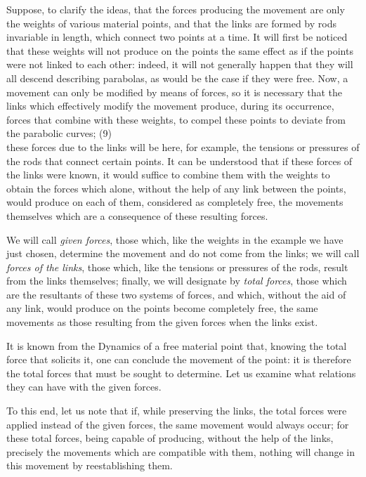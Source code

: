 \documentclass{book}
\begin{document}
Suppose, to clarify the ideas, that the forces producing the movement are only the weights of various material points, and that the links are formed by rods invariable in length, which connect two points at a time. It will first be noticed that these weights will not produce on the points the same effect as if the points were not linked to each other: indeed, it will not generally happen that they will all descend describing parabolas, as would be the case if they were free. Now, a movement can only be modified by means of forces, so it is necessary that the links which effectively modify the movement produce, during its occurrence, forces that combine with these weights, to compel these points to deviate from the parabolic curves; 
\newpage
(9)\\
these forces due to the links will be here, for example, the tensions or pressures of the rods that connect certain points. It can be understood that if these forces of the links were known, it would suffice to combine them with the weights to obtain the forces which alone, without the help of any link between the points, would produce on each of them, considered as completely free, the movements themselves which are a consequence of these resulting forces.

We will call \textit{given forces}, those which, like the weights in the example we have just chosen, determine the movement and do not come from the links; we will call \textit{forces of the links}, those which, like the tensions or pressures of the rods, result from the links themselves; finally, we will designate by \textit{total forces}, those which are the resultants of these two systems of forces, and which, without the aid of any link, would produce on the points become completely free, the same movements as those resulting from the given forces when the links exist.

It is known from the Dynamics of a free material point that, knowing the total force that solicits it, one can conclude the movement of the point: it is therefore the total forces that must be sought to determine. Let us examine what relations they can have with the given forces.

To this end, let us note that if, while preserving the links, the total forces were applied instead of the given forces, the same movement would always occur; for these total forces, being capable of producing, without the help of the links, precisely the movements which are compatible with them, nothing will change in this movement by reestablishing them.
\end{document}
